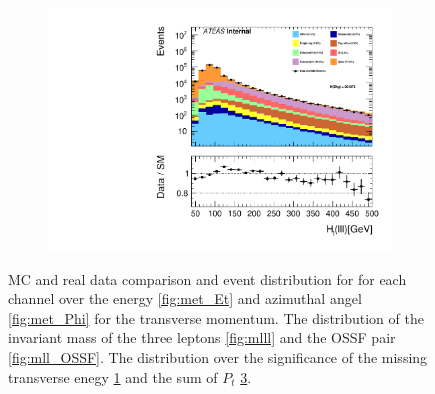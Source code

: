 \begin{figure}
{\begin{subfigure}{.425\textwidth}
        \caption{}
        \label{fig:met_Sign}
    \end{subfigure}
    \hfill
    \begin{subfigure}{.425\textwidth}
        \includegraphics[width=\textwidth]{Figures/FeaturesHistograms/Ht_lll.pdf}
        \caption{}
        \label{fig:Ht_lll}
    \end{subfigure}
    }
    \caption{\ac{MC} and real data comparison and event distribution for for each channel over the energy \ref{fig:met_Et} and azimuthal
    angel \ref{fig:met_Phi} for the transverse momentum. The distribution of the invariant mass of the
    three leptons \ref{fig:mlll} and the OSSF pair \ref{fig:mll_OSSF}. The distribution over the significance
    of the missing transverse enegy \ref{fig:met_Sign} and the sum of $P_t$ \ref{fig:Ht_lll}.}
\end{figure}
\newpage
